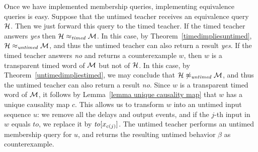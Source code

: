 Once we have implemented membership queries, implementing equivalence queries is easy.
Suppose that the untimed teacher receives an equivalence query ${\cal H}$.
Then we just forward this query to the timed teacher.
If the timed teacher answers \emph{yes} then ${\cal H} \approx_{\mathit{timed}} {\cal M}$.
In this case, by Theorem~\ref{timedimpliesuntimed}, ${\cal H} \approx_{\mathit{untimed}} {\cal M}$,
and thus the untimed teacher can also return a result \emph{yes}.
If the timed teacher answers \emph{no} and returns a counterexample $w$,
then $w$ is a transparent timed word of ${\cal M}$ but not of ${\cal H}$.
In this case, by Theorem~\ref{untimedimpliestimed}, we may conclude that
${\cal H} \not\approx_{\mathit{untimed}} {\cal M}$, and thus the untimed teacher can also return a result \emph{no}.
Since $w$ is a transparent timed word of ${\cal M}$, it 
\iflong
follows by Lemma~\ref{lemma unique causality map} that $w$ 
\fi
has a unique causality map $c$.
This allows us to transform $w$ into an untimed input sequence $u$: 
we remove all the delays and output events, and if the $j$-th
input in $w$ equals $\mathit{to}$, we replace it by $\mathit{to}[x_{c(j)}]$.
The untimed teacher performs an untimed membership query for $u$, and returns the resulting 
untimed behavior $\beta$ as counterexample.






